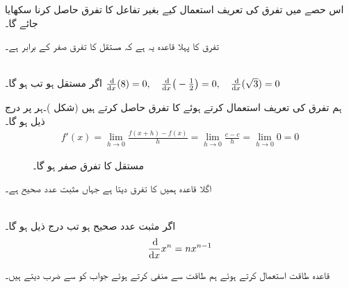 اس حصے میں تفرق کی تعریف استعمال کیے بغیر تفاعل کا تفرق حاصل کرنا سکھایا جائے گا۔

تفرق کا پہلا قاعدہ یہ ہے کہ مستقل کا تفرق صفر کے برابر ہے۔

\\
اگر  مستقل ہو تب  ہو گا۔
$\frac{\dif}{\dif x} (8)=0,\quad \frac{\dif}{\dif x}\big(-\frac{1}{2}\big)=0,\quad \frac{\dif}{\dif x}(\sqrt{3})=0$

ہم تفرق کی تعریف استعمال کرتے ہوئے  کا تفرق حاصل کرتے ہیں (شکل )۔ہر  پر درج ذیل ہو گا۔
\begin{align*}
f'(x)=\lim_{h\to 0}\frac{f(x+h)-f(x)}{h}=\lim_{h\to 0}\frac{c-c}{h}=\lim_{h\to 0}0=0
\end{align*} 
%
\begin{figure}
\centering
{}
\caption{مستقل کا تفرق صفر ہو گا۔}
\label{شکل_تفرق_مستقل_صفر_ہو_گا}
\end{figure}

اگلا قاعدہ ہمیں  کا تفرق دیتا ہے جہاں  مثبت عدد صحیح ہے۔

\\
اگر  مثبت عدد صحیح ہو تب درج ذیل ہو گا۔
\begin{align*}
\frac{\dif}{\dif x} x^n=nx^{n-1}
\end{align*}

قاعدہ طاقت استعمال کرتے ہوئے ہم  طاقت  سے  منفی کرتے ہوئے جواب کو  سے ضرب دیتے ہیں۔

